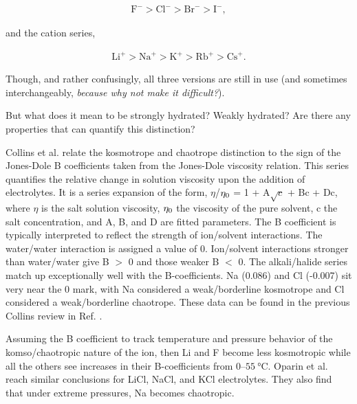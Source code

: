 \begin{intro}
    \begin{equation}\label{hof3}
     \begin{split}
     \text{F}^{-} > \text{Cl}^{-} > \text{Br}^{-} > \text{I}^{-},
     \end{split}
    \end{equation}
    
    \noindent and the cation series,
    
    \begin{equation}\label{hof4}
     \begin{split}
      \text{Li}^{+} > \text{Na}^{+} > \text{K}^{+} > \text{Rb}^{+} > \text{Cs}^{+}.
     \end{split}
    \end{equation}
    
    \noindent Though, and rather confusingly, all three versions are still in use (and sometimes interchangeably, \emph{because why not make it difficult?})\cite{ball2015water}.
    
    But what does it mean to be strongly hydrated? Weakly hydrated? Are there any properties that can quantify this distinction?
    
    Collins et al.\cite{collins2007review} relate the kosmotrope and chaotrope distinction to the sign of the Jones-Dole B coefficients taken from the Jones-Dole viscosity 
    relation. This series quantifies the relative change in solution viscosity upon the addition of electrolytes. It is a series expansion of the form, $\eta$/$\eta_{\mathrm{0}}$ 
    = 1 + A$\sqrt{c}$ + Bc + Dc, where $\eta$ is the salt solution viscosity, $\eta_{\mathrm{0}}$ the viscosity of the pure solvent, c the salt concentration, and A, B, and D
    are fitted parameters. The B coefficient is typically interpreted to reflect the strength of ion/solvent interactions\cite{jenkins1995viscosity}. The water/water interaction
    is assigned a value of 0. Ion/solvent interactions stronger than water/water give B $>$ 0 and those weaker B $<$ 0. The alkali/halide series match up exceptionally well 
    with the B-coefficients. Na\sur{+} (0.086) and Cl\sur{-} (-0.007) sit very near the 0 mark, with Na\sur{+} considered a weak/borderline kosmotrope and Cl\sur{-} considered 
    a weak/borderline chaotrope. These data can be found in the previous Collins review in Ref. \cite{collins2004ions}. 
    
    Assuming the B coefficient to track temperature and pressure behavior of the komso/chaotropic nature of the ion, then Li\sur{+} and F\sur{-} become less kosmotropic while 
    all the others see increases in their B-coefficients from 0--$\SI{55}{\degreeCelsius}$\cite{jenkins1995viscosity}. Oparin et al. reach similar conclusions for LiCl, NaCl, 
    and KCl electrolytes\cite{oparin2002relationship}. They also find that under extreme pressures, Na\sur{+} becomes chaotropic\cite{oparin2002relationship}.
    

\end{intro}
